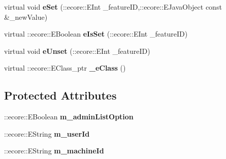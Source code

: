 \begin{DoxyCompactItemize}
\item 
\hypertarget{classUMS__Data_1_1ListLocalAccOptions_a0bfcf2669c1eab2e5882b9df5aaacb83}{
virtual void {\bfseries eSet} (::ecore::EInt \_\-featureID,::ecore::EJavaObject const \&\_\-newValue)}
\label{classUMS__Data_1_1ListLocalAccOptions_a0bfcf2669c1eab2e5882b9df5aaacb83}

\item 
\hypertarget{classUMS__Data_1_1ListLocalAccOptions_ae1029751b2fd3c2467679a833d6db46b}{
virtual ::ecore::EBoolean {\bfseries eIsSet} (::ecore::EInt \_\-featureID)}
\label{classUMS__Data_1_1ListLocalAccOptions_ae1029751b2fd3c2467679a833d6db46b}

\item 
\hypertarget{classUMS__Data_1_1ListLocalAccOptions_abebff45080c9043ac3cd456b6970c702}{
virtual void {\bfseries eUnset} (::ecore::EInt \_\-featureID)}
\label{classUMS__Data_1_1ListLocalAccOptions_abebff45080c9043ac3cd456b6970c702}

\item 
\hypertarget{classUMS__Data_1_1ListLocalAccOptions_af26673c886133062ba9e744c73c1ac12}{
virtual ::ecore::EClass\_\-ptr {\bfseries \_\-eClass} ()}
\label{classUMS__Data_1_1ListLocalAccOptions_af26673c886133062ba9e744c73c1ac12}

\end{DoxyCompactItemize}
\subsection*{Protected Attributes}
\begin{DoxyCompactItemize}
\item 
\hypertarget{classUMS__Data_1_1ListLocalAccOptions_a7bb22b1d5e85b6a78b88baa0e8e25bcf}{
::ecore::EBoolean {\bfseries m\_\-adminListOption}}
\label{classUMS__Data_1_1ListLocalAccOptions_a7bb22b1d5e85b6a78b88baa0e8e25bcf}

\item 
\hypertarget{classUMS__Data_1_1ListLocalAccOptions_a142ebca591164f8f7b74bd430f313d65}{
::ecore::EString {\bfseries m\_\-userId}}
\label{classUMS__Data_1_1ListLocalAccOptions_a142ebca591164f8f7b74bd430f313d65}

\item 
\hypertarget{classUMS__Data_1_1ListLocalAccOptions_a231895e91d7357b3fed9ca5249914ca3}{
::ecore::EString {\bfseries m\_\-machineId}}
\label{classUMS__Data_1_1ListLocalAccOptions_a231895e91d7357b3fed9ca5249914ca3}

\end{DoxyCompactItemize}


